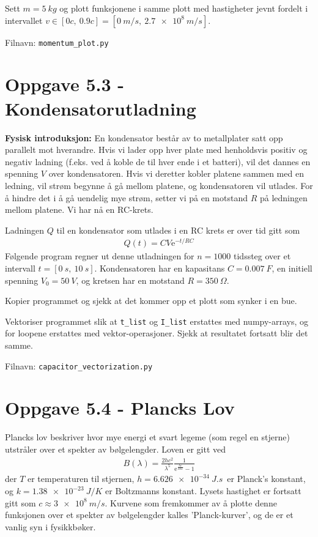 \documentclass[10pt,a4paper]{article}
\renewcommand{\exp}{\mathrm{e}^}
\newcommand{\planck}{$h = \SI{6.626e-34}{J.s}$}
\begin{document}
Sett $m = \SI{5}{kg}$ og plott funksjonene i samme plott med hastigheter jevnt fordelt i intervallet $v \in [0c,\ 0.9c] = [\SI{0}{m/s},\ \SI{2.7e8}{m/s}]$.

Filnavn: \texttt{momentum\_plot.py}



\section*{Oppgave 5.3 - Kondensatorutladning}
\textbf{Fysisk introduksjon:} En kondensator består av to metallplater satt opp parallelt mot hverandre. Hvis vi lader opp hver plate med henholdsvis positiv og negativ ladning (f.eks. ved å koble de til hver ende i et batteri), vil det dannes en spenning $V$ over kondensatoren. Hvis vi deretter kobler platene sammen med en ledning, vil strøm begynne å gå mellom platene, og kondensatoren vil utlades. For å hindre det i å gå uendelig mye strøm, setter vi på en motstand $R$ på ledningen mellom platene. Vi har nå en RC-krets.

Ladningen $Q$ til en kondensator som utlades i en RC krets er over tid gitt som
\begin{align*}
Q(t) = CV\exp{-t/RC}
\end{align*}
Følgende program regner ut denne utladningen for $n=1000$ tidssteg over et intervall $t = [\SI{0}{s},\ \SI{10}{s}]$. Kondensatoren har en kapasitans $C = \SI{0.007}{F}$, en initiell spenning $V_0 = \SI{50}{V}$, og kretsen har en motstand $R = \SI{350}{\Omega}$.

Kopier programmet og sjekk at det kommer opp et plott som synker i en bue.

Vektoriser programmet slik at \texttt{t\_list} og \texttt{I\_list} erstattes med numpy-arrays, og for loopene erstattes med vektor-operasjoner. Sjekk at resultatet fortsatt blir det samme.

Filnavn: \texttt{capacitor\_vectorization.py}




\section*{Oppgave 5.4 - Plancks Lov}
Plancks lov beskriver hvor mye energi et svart legeme (som regel en stjerne) utstråler over et spekter av bølgelengder. Loven er gitt ved
\begin{align*}
B(\lambda) = \frac{2hc^2}{\lambda^5}\frac{1}{\exp{\frac{hc}{\lambda k T}}-1}
\end{align*}
der $T$ er temperaturen til stjernen, \planck\  er Planck's konstant, og $k = \SI{1.38e-23}{J/K}$ er Boltzmanns konstant. Lysets hastighet er fortsatt gitt som $c \approx \SI{3e8}{m/s}$. Kurvene som fremkommer av å plotte denne funksjonen over et spekter av bølgelengder kalles 'Planck-kurver', og de er et vanlig syn i fysikkbøker.
\end{document}
